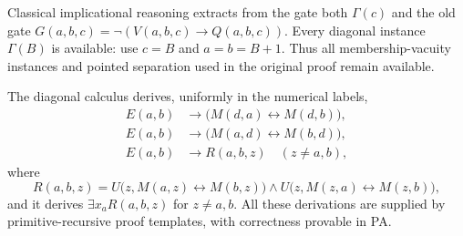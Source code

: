 Classical implicational reasoning extracts from the gate both
$\Gamma(c)$ and the old gate $G(a,b,c)=\neg(V(a,b,c)\to Q(a,b,c))$.
Every diagonal instance $\Gamma(B)$ is available: use $c=B$ and
$a=b=B+1$. Thus all membership-vacuity instances and pointed separation
used in the original proof remain available.

\begin{lemma}
\label{lem:pa-diagonal-interfaces}
The diagonal calculus derives, uniformly in the numerical labels,
\begin{align*}
 E(a,b)&\to\bigl(M(d,a)\leftrightarrow M(d,b)\bigr),\\
 E(a,b)&\to\bigl(M(a,d)\leftrightarrow M(b,d)\bigr),\\
 E(a,b)&\to R(a,b,z)\quad (z\ne a,b),
\end{align*}
where
\[
 R(a,b,z)=U\bigl(z,M(a,z)\leftrightarrow M(b,z)\bigr)
 \wedge U\bigl(z,M(z,a)\leftrightarrow M(z,b)\bigr),
\]
and it derives $\exists x_a R(a,b,z)$ for $z\ne a,b$.
All these derivations are supplied by primitive-recursive proof templates,
with correctness provable in PA.
\end{lemma}

